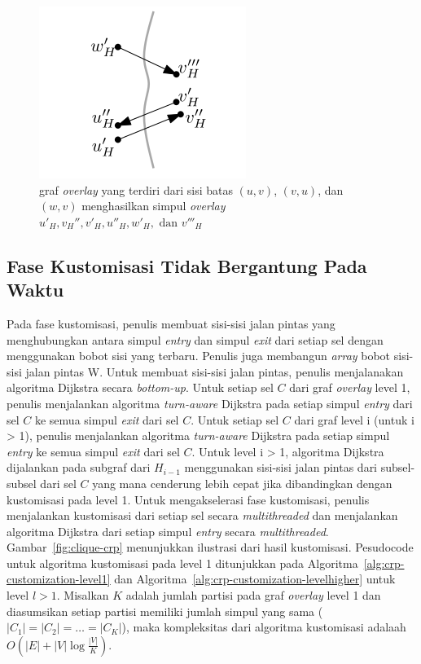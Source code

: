 \begin{figure}[H]
    \centering
    \includegraphics[]{figures/overlay_crp.png}
    \caption{graf \textit{overlay} yang terdiri dari sisi batas $(u,v)$, $(v,u)$, dan $(w,v)$ menghasilkan simpul \textit{overlay} $u'_{H},v_H'',v'_H,u''_H,w'_H, \text{ dan }v'''_H$ }
    \label{fig:crp-overlay}
\end{figure}




\subsection{Fase Kustomisasi Tidak Bergantung Pada Waktu}
\label{subsec:tdcrp-kustomisasi}
Pada fase kustomisasi, penulis membuat sisi-sisi jalan pintas yang menghubungkan antara simpul \textit{entry} dan simpul \textit{exit} dari setiap sel dengan menggunakan bobot sisi yang terbaru. Penulis juga membangun \textit{array} bobot sisi-sisi jalan pintas W. Untuk membuat sisi-sisi jalan pintas, penulis menjalanakan algoritma Dijkstra secara \textit{bottom-up}. Untuk setiap sel $C$ dari graf \textit{overlay} level 1, penulis menjalankan algoritma \textit{turn-aware} Dijkstra pada setiap simpul \textit{entry} dari sel $C$ ke semua simpul \textit{exit} dari sel $C$. Untuk setiap sel $C$ dari graf level i (untuk i > 1), penulis menjalankan algoritma \textit{turn-aware} Dijkstra pada setiap simpul \textit{entry} ke semua simpul \textit{exit} dari sel $C$. Untuk level i > 1, algoritma Dijkstra dijalankan pada subgraf dari $H_{i-1}$ menggunakan sisi-sisi jalan pintas dari subsel-subsel dari sel $C$ yang mana cenderung lebih cepat jika dibandingkan dengan kustomisasi pada level 1. Untuk mengakselerasi fase kustomisasi, penulis menjalankan kustomisasi dari setiap sel secara \textit{multithreaded} dan menjalankan algoritma Dijkstra dari setiap simpul \textit{entry} secara \textit{multithreaded}. Gambar~\ref{fig:clique-crp} menunjukkan ilustrasi dari hasil kustomisasi. Pesudocode untuk algoritma kustomisasi pada level 1 ditunjukkan pada Algoritma~\ref{alg:crp-customization-level1} dan Algoritma~\ref{alg:crp-customization-levelhigher} untuk level $l>1$. Misalkan $K$ adalah jumlah partisi pada graf \textit{overlay} level 1 dan diasumsikan setiap partisi memiliki jumlah simpul yang sama ($|C_1|=|C_2|=\ldots =|C_K|$), maka kompleksitas dari algoritma kustomisasi adalaah $O(|E|+|V|\log \frac{|V|}{K})$.

